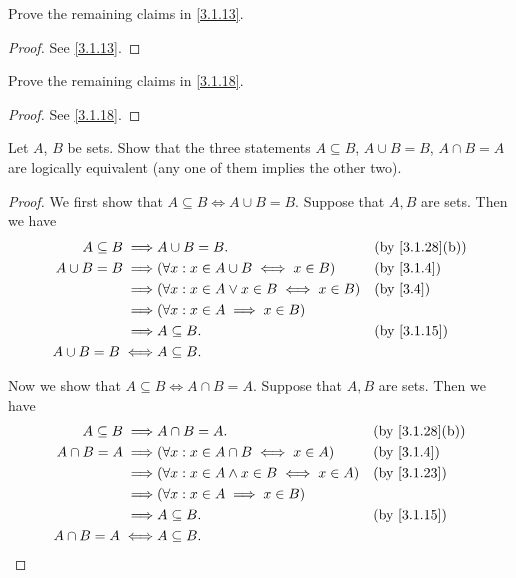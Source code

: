\begin{ex}\label{ex:3.1.3}
  Prove the remaining claims in \cref{3.1.13}.
\end{ex}

\begin{proof}
  See \cref{3.1.13}.
\end{proof}

\begin{ex}\label{ex:3.1.4}
  Prove the remaining claims in \cref{3.1.18}.
\end{ex}

\begin{proof}
  See \cref{3.1.18}.
\end{proof}

\begin{ex}\label{ex:3.1.5}
  Let \(A\), \(B\) be sets.
  Show that the three statements \(A \subseteq B\), \(A \cup B = B\), \(A \cap B = A\) are logically equivalent (any one of them implies the other two).
\end{ex}

\begin{proof}
  We first show that \(A \subseteq B \iff A \cup B = B\).
  Suppose that \(A, B\) are sets.
  Then we have
  \begin{align*}
    A \subseteq B \implies & A \cup B = B.                                   &  & \text{(by \cref{3.1.28}(b))} \\
    A \cup B = B \implies  & (\forall x : x \in A \cup B \iff x \in B)       &  & \by{3.1.4}                   \\
    \implies               & (\forall x : x \in A \lor x \in B \iff x \in B) &  & \text{(by \cref{3.4})}       \\
    \implies               & (\forall x : x \in A \implies x \in B)                                            \\
    \implies               & A \subseteq B.                                  &  & \by{3.1.15}                  \\
    A \cup B = B \iff      & A \subseteq B.
  \end{align*}

  Now we show that \(A \subseteq B \iff A \cap B = A\).
  Suppose that \(A, B\) are sets.
  Then we have
  \begin{align*}
    A \subseteq B \implies & A \cap B = A.                                    &  & \text{(by \cref{3.1.28}(b))} \\
    A \cap B = A \implies  & (\forall x : x \in A \cap B \iff x \in A)        &  & \by{3.1.4}                   \\
    \implies               & (\forall x : x \in A \land x \in B \iff x \in A) &  & \by{3.1.23}                  \\
    \implies               & (\forall x : x \in A \implies x \in B)                                             \\
    \implies               & A \subseteq B.                                   &  & \by{3.1.15}                  \\
    A \cap B = A \iff      & A \subseteq B.
  \end{align*}
\end{proof}

